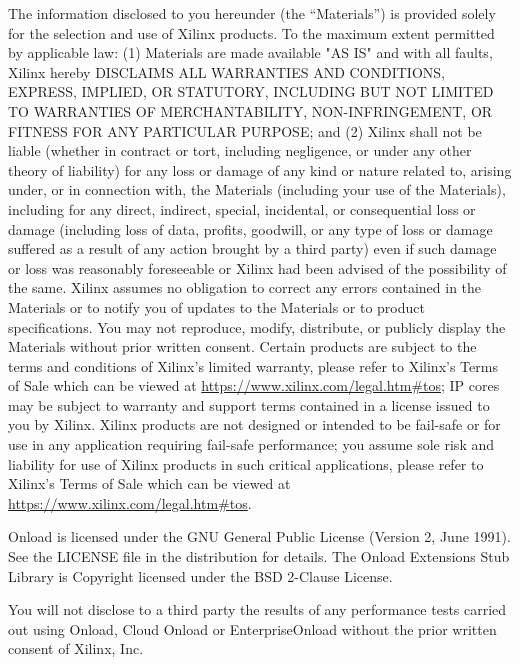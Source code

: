 The information disclosed to you hereunder (the “Materials”) is provided 
solely for the selection and use of Xilinx products. To the maximum extent 
permitted by applicable law: (1) Materials are made available "AS IS" and 
with all faults, Xilinx hereby DISCLAIMS ALL WARRANTIES AND CONDITIONS, 
EXPRESS, IMPLIED, OR STATUTORY, INCLUDING BUT NOT LIMITED TO WARRANTIES OF 
MERCHANTABILITY, NON-INFRINGEMENT, OR FITNESS FOR ANY PARTICULAR PURPOSE; and 
(2) Xilinx shall not be liable (whether in contract or tort, including 
negligence, or under any other theory of liability) for any loss or damage of 
any kind or nature related to, arising under, or in connection with, the 
Materials (including your use of the Materials), including for any direct, 
indirect, special, incidental, or consequential loss or damage (including 
loss of data, profits, goodwill, or any type of loss or damage suffered as a 
result of any action brought by a third party) even if such damage or loss 
was reasonably foreseeable or Xilinx had been advised of the possibility of 
the same. Xilinx assumes no obligation to correct any errors contained in the 
Materials or to notify you of updates to the Materials or to product 
specifications. You may not reproduce, modify, distribute, or publicly 
display the Materials without prior written consent. Certain products are 
subject to the terms and conditions of Xilinx’s limited warranty, please 
refer to Xilinx’s Terms of Sale which can be viewed at 
\href{https://www.xilinx.com/legal.htm\#tos}{https://www.xilinx.com/legal.htm\#tos}; 
IP cores may be subject to warranty and support terms contained in a license 
issued to you by Xilinx. Xilinx products are not designed or intended to be 
fail-safe or for use in any application requiring fail-safe performance; you 
assume sole risk and liability for use of Xilinx products in such critical 
applications, please refer to Xilinx’s Terms of Sale which can be viewed at 
\href{https://www.xilinx.com/legal.htm\#tos}{https://www.xilinx.com/legal.htm\#tos}.

Onload is licensed under the GNU General Public License (Version 2, June
1991). See the LICENSE file in the distribution for details. The Onload
Extensions Stub Library is Copyright licensed under the BSD 2-Clause
License.

You will not disclose to a third party the results of any performance
tests carried out using Onload, Cloud Onload  or EnterpriseOnload without the 
prior written consent of Xilinx, Inc.

